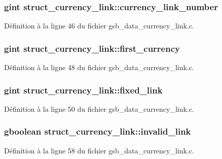 \subsubsection[{currency\_\-link\_\-number}]{\setlength{\rightskip}{0pt plus 5cm}gint {\bf struct\_\-currency\_\-link::currency\_\-link\_\-number}}\label{structstruct__currency__link_a34da59583518bf1e4cfd4f972bab171d}


Définition à la ligne 46 du fichier gsb\_\-data\_\-currency\_\-link.c.

\subsubsection[{first\_\-currency}]{\setlength{\rightskip}{0pt plus 5cm}gint {\bf struct\_\-currency\_\-link::first\_\-currency}}\label{structstruct__currency__link_ac5c91d69b502dc6634976e35d6df515c}


Définition à la ligne 48 du fichier gsb\_\-data\_\-currency\_\-link.c.

\subsubsection[{fixed\_\-link}]{\setlength{\rightskip}{0pt plus 5cm}gint {\bf struct\_\-currency\_\-link::fixed\_\-link}}\label{structstruct__currency__link_a7ed0707566c75682349ce9937fbbe86b}


Définition à la ligne 50 du fichier gsb\_\-data\_\-currency\_\-link.c.

\subsubsection[{invalid\_\-link}]{\setlength{\rightskip}{0pt plus 5cm}gboolean {\bf struct\_\-currency\_\-link::invalid\_\-link}}\label{structstruct__currency__link_ae784379dce1f26c4e63c7144430cec57}


Définition à la ligne 58 du fichier gsb\_\-data\_\-currency\_\-link.c.

